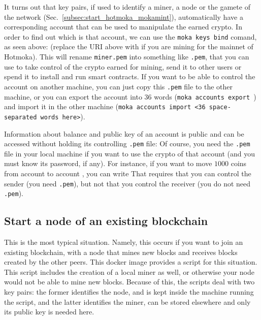 It turns out that key pairs, if used to identify a miner, a node or the gamete of the network
(Sec.~\ref{subsec:start_hotmoka_mokamint}), automatically have a corresponding account
that can be used to manipulate the earned crypto. In order to find out which is that account,
we can use the \texttt{moka keys bind} comand, as seen above:
%
%
(replace the URI above with \texttt{\serverMokamintMain{}} if you are mining for the mainnet of Hotmoka).
This will rename \texttt{miner.pem} into something like \texttt{\gameteShort{}.pem}, that you can
use to take control of the crypto earned for mining, send it to other users or spend it
to install and run smart contracts. If you want to be able to control the account on another machine,
you can just copy this \texttt{\gameteShort{}.pem} file to the other machine,
or you can export the account into $36$ words (\texttt{moka accounts export \gameteShort{}})
and import it in the other machine (\texttt{moka accounts import <36 space-separated words here>}).

Information about balance and public key of an account is public and can be accessed
without holding its controlling \texttt{.pem} file:
%
%
Of course, you need the \texttt{\gameteShort{}.pem} file in your local machine if you want to use
the crypto of that account (and you must know its password, if any). For instance, if you want to move $1000$
coins from account \texttt{\gameteShort{}} to account \texttt{\manifestShort{}}, you can write
%
%
That requires that you can control the sender (you need \texttt{\gameteShort{}.pem}),
but not that you control the receiver (you do not need \texttt{\manifestShort{}.pem}).

\subsection{Start a node of an existing blockchain}\label{subsec:join_hotmoka_mokamint}

This is the most typical situation. Namely, this occurs if you want to join an existing blockchain,
with a node that mines new blocks and receives blocks created by the other peers.
This docker image provides a script for this situation. This script includes the creation of
a local miner as well, or otherwise your node would not be able to mine new blocks.
Because of this, the scripts deal with two key pairs: the former identifies the node,
and is kept inside the machine running the script, and the latter identifies the miner,
can be stored elsewhere and only its public key is needed here.

